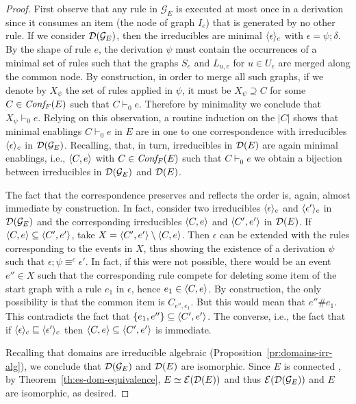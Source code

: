 \begin{proof}
  First observe that any rule in $\mathcal{G}_{E}$ is executed at
  most once in a derivation since it consumes an item (the node of graph
  $I_e$) that is generated by no other rule. If we consider
  $\mathcal{D}({\mathcal{G}_{E}})$, then the irreducibles are minimal
  $\langle {\epsilon}\rangle_c$ with $\epsilon = \psi; \delta$.
  By the shape of rule $e$, the derivation $\psi$ must contain
  the occurrences of a minimal set of rules such that the graphs
  $S_e$ and $L_{u,e}$ for $u \in U_e $ are merged along the common node.
  By construction, in order to merge all such graphs, if we denote by
  $X_\psi$ the set of rules applied in $\psi$, it must be
  $X_\psi \supseteq C$ for some $C \in \mathit{Conf_F}({E})$ such that
  $C \vdash_0 e$. Therefore by minimality we conclude that
  $X_\psi \vdash_0 e$. Relying on this observation, a routine
  induction on the $|C|$ shows that minimal enablings $C \vdash_0 e$
  in $E$ are in one to one correspondence with irreducibles
  $\langle {\epsilon}\rangle_c$ in $\mathcal{D}({\mathcal{G}_{E}})$. Recalling, that, in
  turn, irreducibles in $\mathcal{D}({E})$ are again minimal enablings, i.e.,
  $\langle{C}, {e}\rangle$ with $C \in\mathit{Conf_F}({E})$ such that $C \vdash_0 e$ we
  obtain a bijection between irreducibles in $\mathcal{D}({\mathcal{G}_{E}})$
  and $\mathcal{D}({E})$.
  
  The fact that the correspondence preserves and reflects the order
  is, again, almost immediate by construction. In fact, consider two
  irreducibles $\langle {\epsilon}\rangle_c$ and $\langle {\epsilon'}\rangle_c$ in
  $\mathcal{D}({\mathcal{G}_{E}})$ and the corresponding irreducibles
  $\langle{C}, {e}\rangle$ and $\langle{C'}, {e'}\rangle$ in $\mathcal{D}({E})$. If
  $\langle{C}, {e}\rangle \subseteq \langle{C'}, {e'}\rangle$, take
  $X = \langle{C'}, {e'}\rangle \setminus \langle{C}, {e}\rangle$. Then $\epsilon$ can be
  extended with the rules corresponding to the events in $X$, thus
  showing the existence of a derivation $\psi$ such that
  $\epsilon; \psi \equiv^c \epsilon'$. In fact, if this were not
  possible, there would be an event $e'' \in X$ such that the
  corresponding rule compete for deleting some item of the start graph
  with a rule $e_1$ in $\epsilon$, hence $e_1 \in \langle{C}, {e}\rangle$. By
  construction, the only possibility is that the common item is
  $C_{e'',e_1}$. But this would mean that $e'' \# e_1$. This
  contradicts the fact that $\{ e_1, e''\} \subseteq \langle{C'}, {e'}\rangle$.
  The converse, i.e., the fact that if
  $\langle {\epsilon}\rangle_c \sqsubseteq \langle {\epsilon'}\rangle_c$ then
  $\langle{C}, {e}\rangle \subseteq \langle{C'}, {e'}\rangle$ is immediate.


  Recalling that domains are irreducible algebraic
  (Proposition~\ref{pr:domains-irr-alg}), we conclude that
  $\mathcal{D}({\mathcal{G}_{E}})$ and $\mathcal{D}({E})$ are isomorphic. 
  Since $E$ is connected {\esabbr}, by
  Theorem~\ref{th:es-dom-equivalence}, $E \simeq \mathcal{E}({\mathcal{D}({E})})$ and thus
  $\mathcal{E}({\mathcal{D}({\mathcal{G}_{E}})})$ and $E$ are isomorphic, as desired.
\end{proof}

